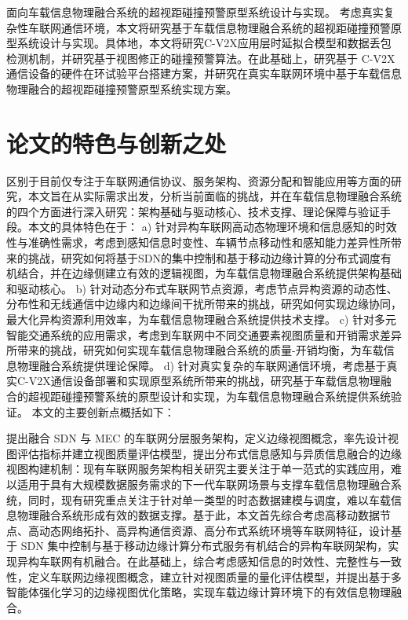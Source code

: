 面向车载信息物理融合系统的超视距碰撞预警原型系统设计与实现。
考虑真实复杂性车联网通信环境，本文将研究基于车载信息物理融合系统的超视距碰撞预警原型系统设计与实现。具体地，本文将研究C-V2X应用层时延拟合模型和数据丢包检测机制，并研究基于视图修正的碰撞预警算法。在此基础上，研究基于 C-V2X 通信设备的硬件在环试验平台搭建方案，并研究在真实车联网环境中基于车载信息物理融合的超视距碰撞预警原型系统实现方案。

\section{论文的特色与创新之处}\label{section 1-6}

区别于目前仅专注于车联网通信协议、服务架构、资源分配和智能应用等方面的研究，本文旨在从实际需求出发，分析当前面临的挑战，并在车载信息物理融合系统的四个方面进行深入研究：架构基础与驱动核心、技术支撑、理论保障与验证手段。本文的具体特色在于：
a) 针对异构车联网高动态物理环境和信息感知的时效性与准确性需求，考虑到感知信息时变性、车辆节点移动性和感知能力差异性所带来的挑战，研究如何将基于SDN的集中控制和基于移动边缘计算的分布式调度有机结合，并在边缘侧建立有效的逻辑视图，为车载信息物理融合系统提供架构基础和驱动核心。
b) 针对动态分布式车联网节点资源，考虑节点异构资源的动态性、分布性和无线通信中边缘内和边缘间干扰所带来的挑战，研究如何实现边缘协同，最大化异构资源利用效率，为车载信息物理融合系统提供技术支撑。
c) 针对多元智能交通系统的应用需求，考虑到车联网中不同交通要素视图质量和开销需求差异所带来的挑战，研究如何实现车载信息物理融合系统的质量-开销均衡，为车载信息物理融合系统提供理论保障。
d) 针对真实复杂的车联网通信环境，考虑基于真实C-V2X通信设备部署和实现原型系统所带来的挑战，研究基于车载信息物理融合的超视距碰撞预警系统的原型设计和实现，为车载信息物理融合系统提供系统验证。
本文的主要创新点概括如下：

 提出融合 SDN 与 MEC 的车联网分层服务架构，定义边缘视图概念，率先设计视图评估指标并建立视图质量评估模型，提出分布式信息感知与异质信息融合的边缘视图构建机制：现有车联网服务架构相关研究主要关注于单一范式的实践应用，难以适用于具有大规模数据服务需求的下一代车联网场景与支撑车载信息物理融合系统，同时，现有研究重点关注于针对单一类型的时态数据建模与调度，难以车载信息物理融合系统形成有效的数据支撑。基于此，本文首先综合考虑高移动数据节点、高动态网络拓扑、高异构通信资源、高分布式系统环境等车联网特征，设计基于 SDN 集中控制与基于移动边缘计算分布式服务有机结合的异构车联网架构，实现异构车联网有机融合。在此基础上，综合考虑感知信息的时效性、完整性与一致性，定义车联网边缘视图概念，建立针对视图质量的量化评估模型，并提出基于多智能体强化学习的边缘视图优化策略，实现车载边缘计算环境下的有效信息物理融合。


